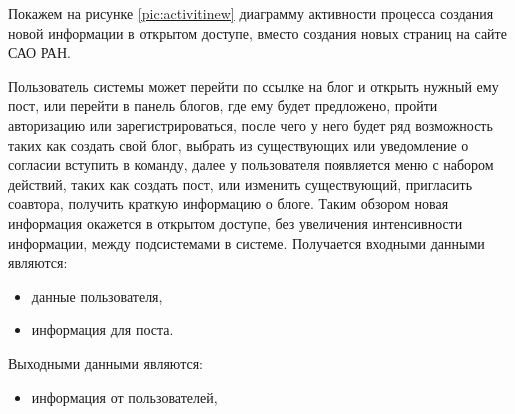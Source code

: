 \pagebreak
Покажем на рисунке \ref{pic:activitinew} диаграмму активности процесса создания новой информации в открытом доступе, вместо создания новых страниц на сайте САО РАН.


Пользователь системы может перейти по ссылке на блог и открыть нужный ему пост, или перейти в панель блогов, где ему будет предложено, пройти авторизацию или зарегистрироваться, после чего у него будет ряд возможность таких как создать свой блог, выбрать из существующих или уведомление о согласии вступить в команду, далее у пользователя появляется меню с набором действий, таких как создать пост, или изменить существующий, пригласить соавтора, получить краткую информацию о блоге. Таким обзором новая информация окажется в открытом доступе, без увеличения интенсивности информации, между подсистемами в системе.
Получается входными данными являются:
\begin{itemize}
	\item данные пользователя,
	\item информация для поста.
\end{itemize}
Выходными данными являются:
\begin{itemize}
	\item информация от пользователей,
\end{itemize}  



\pagebreak